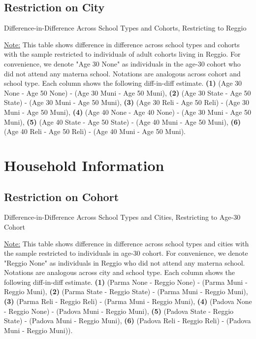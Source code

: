 \documentclass[11pt]{article}
\begin{document}
\subsection{Restriction on City}
\begin{table}[H]
\begin{center}
	\caption{Difference-in-Difference Across School Types and Cohorts, Restricting to Reggio}
	\scalebox{0.80}{
		}
\end{center}
\footnotesize
\underline{Note:} This table shows difference in difference across school types and cohorts with the sample restricted to individuals of adult cohorts living in Reggio. For convenience, we denote "Age 30 None" as individuals in the age-30 cohort who did not attend any materna school. Notations are analogous across cohort and school type. Each column shows the following diff-in-diff estimate. \textbf{(1)} (Age 30 None - Age 50 None) - (Age 30 Muni - Age 50 Muni), \textbf{(2)} (Age 30 State - Age 50 State) - (Age 30 Muni - Age 50 Muni), \textbf{(3)} (Age 30 Reli - Age 50 Reli) - (Age 30 Muni - Age 50 Muni), \textbf{(4)} (Age 40 None - Age 40 None) - (Age 30 Muni - Age 50 Muni),  \textbf{(5)} (Age 40 State - Age 50 State) - (Age 40 Muni - Age 50 Muni), \textbf{(6)} (Age 40 Reli - Age 50 Reli) - (Age 40 Muni - Age 50 Muni). 
\end{table}




\section{Household Information}
\subsection{Restriction on Cohort}
\begin{table}[H]
\begin{center}
	\caption{Difference-in-Difference Across School Types and Cities, Restricting to Age-30 Cohort}
	\scalebox{0.80}{
		}
\end{center}
\footnotesize
\underline{Note:} This table shows difference in difference across school types and cities with the sample restricted to individuals in age-30 cohort. For convenience, we denote "Reggio None" as individuals in Reggio who did not attend any materna school. Notations are analogous across city and school type. Each column shows the following diff-in-diff estimate. \textbf{(1)} (Parma None - Reggio None) - (Parma Muni - Reggio Muni), \textbf{(2)} (Parma State - Reggio State) - (Parma Muni - Reggio Muni), \textbf{(3)} (Parma Reli - Reggio Reli) - (Parma Muni - Reggio Muni), \textbf{(4)} (Padova None - Reggio None) - (Padova Muni - Reggio Muni),  \textbf{(5)} (Padova State - Reggio State) - (Padova Muni - Reggio Muni), \textbf{(6)} (Padova Reli - Reggio Reli) - (Padova Muni - Reggio Muni)). 
\end{table}
\end{document}

